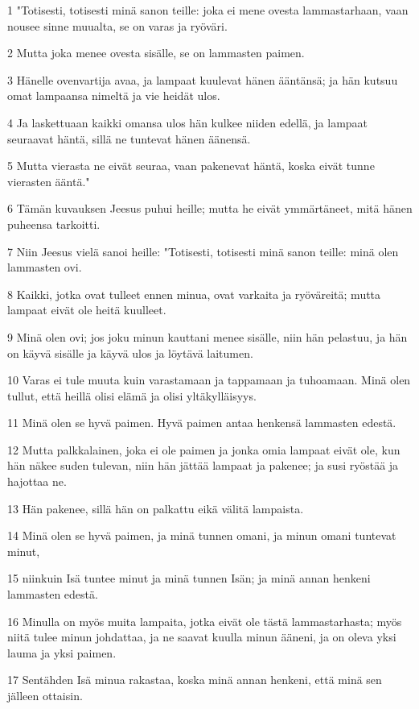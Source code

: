 \par 1 "Totisesti, totisesti minä sanon teille: joka ei mene ovesta lammastarhaan, vaan nousee sinne muualta, se on varas ja ryöväri.
\par 2 Mutta joka menee ovesta sisälle, se on lammasten paimen.
\par 3 Hänelle ovenvartija avaa, ja lampaat kuulevat hänen ääntänsä; ja hän kutsuu omat lampaansa nimeltä ja vie heidät ulos.
\par 4 Ja laskettuaan kaikki omansa ulos hän kulkee niiden edellä, ja lampaat seuraavat häntä, sillä ne tuntevat hänen äänensä.
\par 5 Mutta vierasta ne eivät seuraa, vaan pakenevat häntä, koska eivät tunne vierasten ääntä."
\par 6 Tämän kuvauksen Jeesus puhui heille; mutta he eivät ymmärtäneet, mitä hänen puheensa tarkoitti.
\par 7 Niin Jeesus vielä sanoi heille: "Totisesti, totisesti minä sanon teille: minä olen lammasten ovi.
\par 8 Kaikki, jotka ovat tulleet ennen minua, ovat varkaita ja ryöväreitä; mutta lampaat eivät ole heitä kuulleet.
\par 9 Minä olen ovi; jos joku minun kauttani menee sisälle, niin hän pelastuu, ja hän on käyvä sisälle ja käyvä ulos ja löytävä laitumen.
\par 10 Varas ei tule muuta kuin varastamaan ja tappamaan ja tuhoamaan. Minä olen tullut, että heillä olisi elämä ja olisi yltäkylläisyys.
\par 11 Minä olen se hyvä paimen. Hyvä paimen antaa henkensä lammasten edestä.
\par 12 Mutta palkkalainen, joka ei ole paimen ja jonka omia lampaat eivät ole, kun hän näkee suden tulevan, niin hän jättää lampaat ja pakenee; ja susi ryöstää ja hajottaa ne.
\par 13 Hän pakenee, sillä hän on palkattu eikä välitä lampaista.
\par 14 Minä olen se hyvä paimen, ja minä tunnen omani, ja minun omani tuntevat minut,
\par 15 niinkuin Isä tuntee minut ja minä tunnen Isän; ja minä annan henkeni lammasten edestä.
\par 16 Minulla on myös muita lampaita, jotka eivät ole tästä lammastarhasta; myös niitä tulee minun johdattaa, ja ne saavat kuulla minun ääneni, ja on oleva yksi lauma ja yksi paimen.
\par 17 Sentähden Isä minua rakastaa, koska minä annan henkeni, että minä sen jälleen ottaisin.
